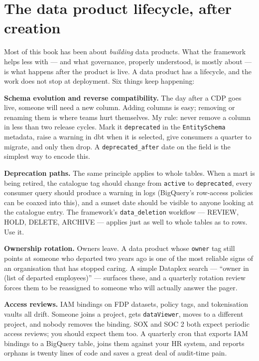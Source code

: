 \documentclass[
  11pt,
  british,
  oneside]{book}
\begin{document}
\hypertarget{the-data-product-lifecycle-after-creation}{%
\section{The data product lifecycle, after
creation}\label{the-data-product-lifecycle-after-creation}}

Most of this book has been about \emph{building} data products. What the
framework helps less with --- and what governance, properly understood,
is mostly about --- is what happens after the product is live. A data
product has a lifecycle, and the work does not stop at
deployment. Six things keep happening:

\textbf{Schema evolution and reverse compatibility.} The day after a CDP
goes live, someone will need a new column. Adding columns is easy;
removing or renaming them is where teams hurt themselves. My rule: never
remove a column in less than two release cycles. Mark it
\texttt{deprecated} in the \texttt{EntitySchema} metadata, raise a
warning in dbt when it is selected, give consumers a quarter to migrate,
and only then drop. A \texttt{deprecated\_after} date on the field is
the simplest way to encode this.

\textbf{Deprecation paths.} The same principle applies to whole tables.
When a mart is being retired, the catalogue tag should change from
\texttt{active} to \texttt{deprecated}, every consumer query should
produce a warning in logs (BigQuery's row-access policies can be coaxed
into this), and a sunset date should be visible to anyone looking at the
catalogue entry. The framework's \texttt{data\_deletion} workflow ---
REVIEW, HOLD, DELETE, ARCHIVE --- applies just as well to whole tables
as to rows. Use it.

\textbf{Ownership rotation.} Owners leave. A data product whose
\texttt{owner} tag still points at someone who departed two years ago is
one of the most reliable signs of an organisation that has stopped
caring. A simple Dataplex search --- ``owner in (list of departed
employees)'' --- surfaces these, and a quarterly rotation review forces
them to be reassigned to someone who will actually answer the pager.

\textbf{Access reviews.} IAM bindings on FDP datasets, policy tags, and
tokenisation vaults all drift. Someone joins a project, gets
\texttt{dataViewer}, moves to a different project, and nobody removes
the binding. SOX and SOC 2 both expect periodic access reviews; you
should expect them too. A quarterly cron that exports IAM bindings to a
BigQuery table, joins them against your HR system, and reports orphans
is twenty lines of code and saves a great deal of audit-time pain.
\end{document}

